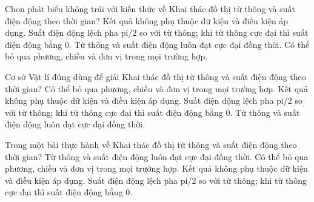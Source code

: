 \begin{ex}
Chọn phát biểu không trái với kiến thức về Khai thác đồ thị từ thông và suất điện động theo thời gian?
\choice
{Kết quả không phụ thuộc dữ kiện và điều kiện áp dụng.}
{\True Suất điện động lệch pha pi/2 so với từ thông; khi từ thông cực đại thì suất điện động bằng 0.}
{Từ thông và suất điện động luôn đạt cực đại đồng thời.}
{Có thể bỏ qua phương, chiều và đơn vị trong mọi trường hợp.}
\end{ex}

\begin{ex}
Cơ sở Vật lí đúng dùng để giải Khai thác đồ thị từ thông và suất điện động theo thời gian?
\choice
{Có thể bỏ qua phương, chiều và đơn vị trong mọi trường hợp.}
{Kết quả không phụ thuộc dữ kiện và điều kiện áp dụng.}
{\True Suất điện động lệch pha pi/2 so với từ thông; khi từ thông cực đại thì suất điện động bằng 0.}
{Từ thông và suất điện động luôn đạt cực đại đồng thời.}
\end{ex}

\begin{ex}
Trong một bài thực hành về Khai thác đồ thị từ thông và suất điện động theo thời gian?
\choice
{Từ thông và suất điện động luôn đạt cực đại đồng thời.}
{Có thể bỏ qua phương, chiều và đơn vị trong mọi trường hợp.}
{Kết quả không phụ thuộc dữ kiện và điều kiện áp dụng.}
{\True Suất điện động lệch pha pi/2 so với từ thông; khi từ thông cực đại thì suất điện động bằng 0.}
\end{ex}

